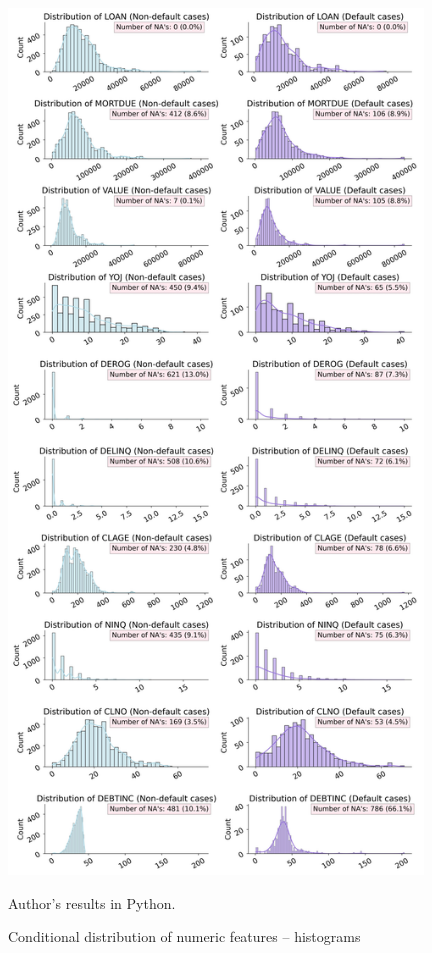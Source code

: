 \begin{figure}[H]
    \begin{center}
    \caption{Conditional distribution of numeric features -- histograms}
    \label{fig:histfeat}
    \includegraphics[width=110mm]{Figures/Continuous_Features_Distribution_Histograms.jpg}
\end{center}
\begin{center}
    \begin{source}Author's results in Python.\end{source}
    \end{center}
\end{figure}

